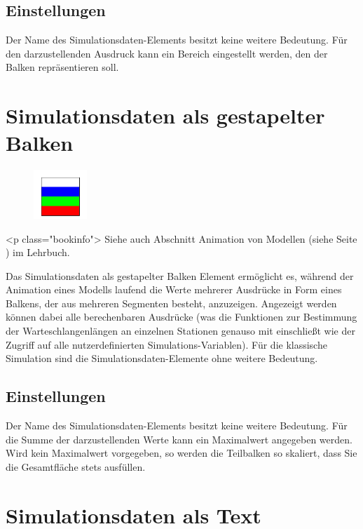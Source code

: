 \subsection*{Einstellungen}

Der Name des Simulationsdaten-Elements besitzt keine weitere Bedeutung. Für den darzustellenden Ausdruck kann
ein Bereich eingestellt werden, den der Balken repräsentieren soll.


\section{Simulationsdaten als gestapelter Balken}
\label{ref:ModelElementAnimationBarStack}

\begin{figure}
\vspace{-22pt}
\includegraphics[width=2cm]{imageModelElementAnimationBarStack.png}
\vspace{-22pt}
\end{figure}

<p class="bookinfo">
Siehe auch Abschnitt Animation von Modellen (siehe Seite \pageref{ref:book:5.4.3}) im Lehrbuch.

Das Simulationsdaten als gestapelter Balken Element ermöglicht es, während der Animation eines Modells laufend die Werte
mehrerer Ausdrücke in Form eines Balkens, der aus mehreren Segmenten besteht, anzuzeigen. Angezeigt werden können dabei
alle berechenbaren Ausdrücke (was die Funktionen zur Bestimmung der Warteschlangenlängen an einzelnen Stationen genauso
mit einschließt wie der Zugriff auf alle nutzerdefinierten Simulations-Variablen). Für die klassische Simulation sind die
Simulationsdaten-Elemente ohne weitere Bedeutung.

\subsection*{Einstellungen}

Der Name des Simulationsdaten-Elements besitzt keine weitere Bedeutung.
Für die Summe der darzustellenden Werte kann ein Maximalwert angegeben werden.
Wird kein Maximalwert vorgegeben, so werden die Teilbalken so skaliert,
dass Sie die Gesamtfläche stets ausfüllen.


\section{Simulationsdaten als Text}
\label{ref:ModelElementAnimationText}

